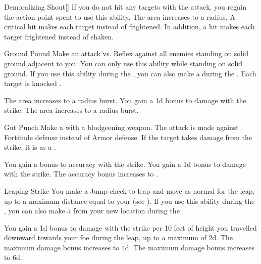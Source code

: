 {\begin{ability}{Demoralizing Shout}[]
                \rankline
                 If you do not hit any targets with the attack, you regain the action point spent to use this ability.
                 The area increases to a \areahuge radius.
                 A critical hit makes each target \panicked instead of frightened.
                In addition, a hit makes each target frightened instead of shaken.
            \end{ability}

            \begin{ability}{Ground Pound}
                Make an attack vs. Reflex against all enemies standing on solid ground adjacent to you.
                You can only use this ability while standing on solid ground.
                If you use this ability during the , you can also make a  during the .
                \hit Each target is knocked \prone.

                \rankline
                 The area increases to a \areamed radius burst.
                 You gain a \plus1d bonus to damage with the strike.
                 The area increases to a \arealarge radius burst.
            \end{ability}

            \begin{ability}{Gut Punch}
                Make a  with a bludgeoning weapon.
                The attack is made against Fortitude defense instead of Armor defense.
                If the target takes damage from the strike, it is \sickened as a .

                \rankline
                 You gain a  bonus to accuracy with the strike.
                 You gain a \plus1d bonus to damage with the strike.
                 The accuracy bonus increases to .
            \end{ability}

            \begin{ability}{Leaping Strike}
                You make a Jump check to leap and move as normal for the leap, up to a maximum distance equal to your  (see ).
                If you use this ability during the , you can also make a  from your new location during the .

                \rankline
                 You gain a \plus1d bonus to damage with the strike per 10 feet of height you travelled downward towards your foe during the leap, up to a maximum of \plus2d.
                 The maximum damage bonus increases to \plus4d.
                 The maximum damage bonus increases to \plus6d.
            \end{ability}

}
